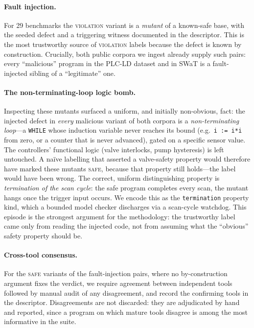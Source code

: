 \paragraph{Fault injection.}
For 29 benchmarks the \textsc{violation} variant is a \emph{mutant} of a known-safe
base, with the seeded defect and a triggering witness documented in the descriptor.
This is the most trustworthy source of \textsc{violation} labels because the defect is
known by construction. Crucially, both public corpora we ingest already supply such
pairs: every ``malicious'' program in the PLC-LD dataset and in SWaT is a
fault-injected sibling of a ``legitimate'' one.

\paragraph{The non-terminating-loop logic bomb.}
Inspecting these mutants surfaced a uniform, and initially non-obvious, fact: the
injected defect in \emph{every} malicious variant of both corpora is a
\emph{non-terminating loop}---a \texttt{WHILE} whose induction variable never reaches
its bound (e.g.\ \texttt{i := i*i} from zero, or a counter that is never advanced),
gated on a specific sensor value. The controllers' functional logic (valve
interlocks, pump hysteresis) is left untouched. A na\"ive labelling that asserted a
valve-safety property would therefore have marked these mutants \textsc{safe}, because
that property still holds---the label would have been wrong. The correct, uniform
distinguishing property is \emph{termination of the scan cycle}: the safe program
completes every scan, the mutant hangs once the trigger input occurs. We encode this
as the \texttt{termination} property kind, which a bounded model checker discharges via
a scan-cycle watchdog. This episode is the strongest argument for the methodology:
the trustworthy label came only from reading the injected code, not from assuming what
the ``obvious'' safety property should be.

\paragraph{Cross-tool consensus.}
For the \textsc{safe} variants of the fault-injection pairs, where no by-construction
argument fixes the verdict, we require agreement between independent tools followed by
manual audit of any disagreement, and record the confirming tools in the descriptor.
Disagreements are not discarded: they are adjudicated by hand and reported, since a
program on which mature tools disagree is among the most informative in the suite.

